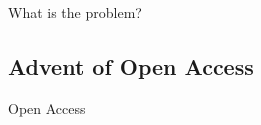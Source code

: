 \documentclass[10pt,compress,serif,aspectratio=169]{beamer}
\newcommand{\fig}[2]{\centering{\texttt{[image: \#2]}}}
\begin{document}

\begin{frame}[t]{What is the problem?}
  \fig{.6}{cash_flow}
\end{frame}


 \subsection{Advent of Open Access}

 \begin{frame}[t]
  \begin{center}
  \vspace{3cm}
  {\huge Open Access}\\
  \end{center}
\end{frame}
\end{document}
